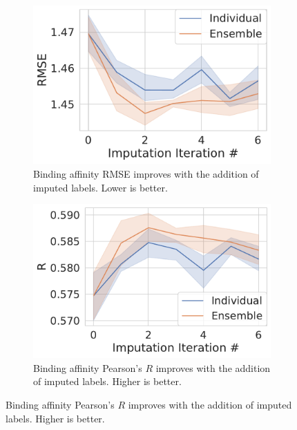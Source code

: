 \documentclass[journal=jmcmar,manuscript=article]{achemso}
\begin{document}
\begin{figure}[tbph]
    \centering
    \begin{subfigure}[t]{0.48\textwidth}
        \centering
        \includegraphics[width=\linewidth]{figures/InitialImpRMSE.pdf}
        \caption{Binding affinity RMSE improves with the addition of imputed labels. Lower is better.}
    \end{subfigure}
    \hfill
    \begin{subfigure}[t]{0.48\textwidth}
        \centering
        \includegraphics[width=\linewidth]{figures/InitialImpR.pdf}
        \caption{Binding affinity Pearson's $R$ improves with the addition of imputed labels. Higher is better.}
    \end{subfigure}


\end{figure}
\end{document}
